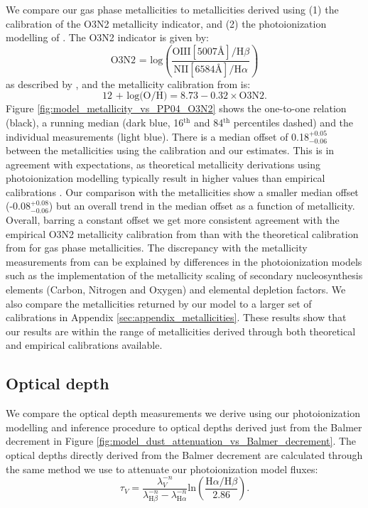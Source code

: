 \documentclass[fleqn,usenatbib]{mnras}
\begin{document}
We compare our gas phase metallicities to metallicities derived using (1) the \cite{pettini2004} calibration of the O3N2 metallicity indicator, and (2) the photoionization modelling of \cite{tremonti2004}. The O3N2 indicator is given by:
\begin{equation}
\label{eq:O3N2_indicator}
    \textrm{O3N2 = log}\left(\frac{\textrm{OIII} [5007\textrm{\AA}] / \textrm{H}\beta}{\textrm{NII} [6584\textrm{\AA}] / \textrm{H}\alpha}\right)
\end{equation}
as described by \citet{alloin1979}, and the metallicity calibration from \cite{pettini2004} is:
\begin{equation}
    \textrm{12 + log(O/H)} = 8.73 - 0.32 \times \textrm{O3N2}.
\end{equation}
Figure \ref{fig:model_metallicity_vs_PP04_O3N2} shows the one-to-one relation (black), a running median (dark blue, 16$^{\textrm{th}}$ and 84$^{\textrm{th}}$ percentiles dashed) and the individual measurements (light blue). There is a median offset of 0.18$_{-0.06}^{+0.05}$ between the metallicities using the \cite{pettini2004} calibration and our estimates. This is in agreement with expectations, as theoretical metallicity derivations using photoionization modelling typically result in higher values than empirical calibrations \citep{kewley2008}. Our comparison with the \cite{tremonti2004} metallicities show a smaller median offset (-0.08$_{-0.06}^{+0.08}$) but an overall trend in the median offset as a function of metallicity. Overall, barring a constant offset we get more consistent agreement with the empirical O3N2 metallicity calibration from \cite{pettini2004} than with the theoretical calibration from \cite{tremonti2004} for gas phase metallicities. The discrepancy with the metallicity measurements from \cite{tremonti2004} can be explained by differences in the photoionization models such as the implementation of the metallicity scaling of secondary nucleosynthesis elements (Carbon, Nitrogen and Oxygen) and elemental depletion factors. We also compare the metallicities returned by our model to a larger set of calibrations in Appendix \ref{sec:appendix_metallicities}. These results show that our results are within the range of metallicities derived through both theoretical and empirical calibrations available. 

\subsection{Optical depth}
We compare the optical depth measurements we derive using our photoionization modelling and inference procedure to optical depths derived just from the Balmer decrement in Figure \ref{fig:model_dust_attenuation_vs_Balmer_decrement}. The optical depths directly derived from the Balmer decrement are calculated through the same method we use to attenuate our photoionization model fluxes:
\begin{equation}
    \tau_{V} = \frac{\lambda_{V}^{-n}}{\lambda_{\textrm{H}\beta}^{-n} - \lambda_{\textrm{H}\alpha}^{-n}} \textrm{ln}\left( \frac{\textrm{H}\alpha/\textrm{H}\beta}{2.86} \right) .
\end{equation}
\end{document}

